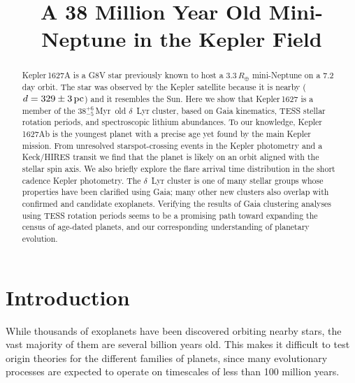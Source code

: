 \documentclass[12pt,modern,twocolumn,tighten]{aastex63}
\newcommand{\clusterage}{$38^{+6}_{-5}$\,Myr} %
\begin{document}
\title{
  A 38 Million Year Old Mini-Neptune in the Kepler Field
}

\NewPageAfterKeywords


\begin{abstract}
  Kepler\,1627A is a G8V star previously known to host a
  $3.3\,R_\oplus$ mini-Neptune on a 7.2\,day orbit.  The star was
  observed by the Kepler satellite because it is nearby
  ($d=329\pm3\,{\rm pc}$) and it resembles the Sun.  Here we show that
  Kepler\,1627 is a member of the \clusterage\ old $\delta$~Lyr
  cluster, based on Gaia kinematics, TESS stellar rotation
  periods, and spectroscopic lithium abundances.  To
  our knowledge, Kepler\,1627Ab is the youngest planet with a precise
  age yet found by the main Kepler mission.  From unresolved
  starspot-crossing events in the Kepler photometry and
  a Keck/HIRES transit we find that the planet is likely on an
  orbit aligned with the stellar spin axis.  We also briefly explore the flare
  arrival time distribution in the short cadence Kepler
  photometry.
  The $\delta$~Lyr cluster is one of many stellar groups whose
  properties have been clarified using Gaia; many other new
  clusters also overlap with confirmed and candidate exoplanets.
  Verifying the results of Gaia clustering analyses using TESS rotation
  periods seems to be a promising path toward expanding the census of
  age-dated planets, and our corresponding understanding of planetary evolution.
\end{abstract}




\section{Introduction}

While thousands of exoplanets have been discovered orbiting nearby
stars, the vast majority of them are several billion years old.  This
makes it difficult to test origin theories for the different families
of planets, since many evolutionary processes are expected to operate
on timescales of less than 100 million years.
\end{document}
